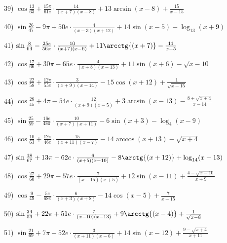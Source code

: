 \documentclass[11pt,ukrainian]{article}
\begin{document}
39) \space 
{ ${\cos\frac{13}{63}} + \frac{15{\pi}}{61 e}\cdot {\frac{14}{(x + 7)(x - 8)}} + {13\arcsin{(x - 8)}} + { \frac{15}{x - 15}}$}
\smallskip\par
40) \space 
{ ${\sin\frac{26}{47}} - 9{\pi} + 50 e\cdot {\frac{4}{(x - 3)(x + 12)}} + {14\sin{(x - 5)}} - {\log_{13}(x + 9)}$}
\smallskip\par
41) \space 
{ ${\sin\frac{8}{64}} - \frac{25 e}{56{\pi}}\cdot {\frac{10}{(x + 7)(x - 6)}} + {11\arcctg{(x + 7)}} - { \frac{11}{x - 5}}$}
\smallskip\par
42) \space 
{ ${\cos\frac{17}{66}} + 30{\pi} - 65 e\cdot {\frac{4}{(x + 8)(x - 13)}} + {11\sin{(x + 6)}} - {\sqrt{x - 10}}$}
\smallskip\par
43) \space 
{ ${\cos\frac{22}{58}} + \frac{12{\pi}}{55 e}\cdot {\frac{3}{(x + 9)(x - 14)}} - {15\cos{(x + 12)}} + {\frac{1}{\sqrt{x - 15}}}$}
\smallskip\par
44) \space 
{ ${\cos\frac{28}{45}} + 4{\pi} - 54 e\cdot {\frac{12}{(x + 9)(x - 5)}} + {3\arcsin{(x - 13)}} - {\frac{8 + \sqrt{x + 4}}{x - 14}}$}
\smallskip\par
45) \space 
{ ${\sin\frac{25}{59}} - \frac{16 e}{48{\pi}}\cdot {\frac{10}{(x + 7)(x + 11)}} - {6\sin{(x + 3)}} - {\log_{4}(x - 9)}$}
\smallskip\par
46) \space 
{ ${\cos\frac{10}{63}} + \frac{12{\pi}}{46 e}\cdot {\frac{15}{(x + 11)(x - 7)}} - {14\arccos{(x + 13)}} - {\sqrt{x + 4}}$}
\smallskip\par
47) \space 
{ ${\sin\frac{18}{67}} + 13{\pi} - 62 e\cdot {\frac{6}{(x + 5)(x - 10)}} - {8\arctg{(x + 12)}} + {\log_{14}(x - 13)}$}
\smallskip\par
48) \space 
{ ${\cos\frac{27}{60}} + 29{\pi} - 57 e\cdot {\frac{7}{(x - 15)(x + 5)}} + {12\sin{(x - 11)}} + {\frac{4 - \sqrt{x - 10}}{x + 9}}$}
\smallskip\par
49) \space 
{ ${\cos\frac{9}{49}} - \frac{5 e}{68{\pi}}\cdot {\frac{6}{(x + 3)(x + 8)}} - {14\cos{(x - 5)}} + { \frac{7}{x - 15}}$}
\smallskip\par
50) \space 
{ ${\sin\frac{24}{53}} + 22{\pi} + 51 e\cdot {\frac{7}{(x - 10)(x - 13)}} + {9\arcctg{(x - 4)}} + {\frac{1}{\sqrt{x - 8}}}$}
\smallskip\par
51) \space 
{ ${\sin\frac{21}{69}} + 7{\pi} - 52 e\cdot {\frac{3}{(x + 11)(x - 6)}} + {14\sin{(x - 12)}} + {\frac{9 - \sqrt{x + 4}}{x + 11}}$}
\smallskip\par
\end{document}
